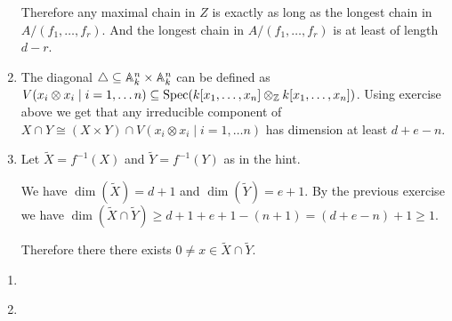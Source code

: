 \begin{exercise}{1}
\begin{enumerate}
{                Therefore any maximal chain in $Z$ is exactly as long as the
                longest chain in $A / (f_1, \dots, f_r)$. And the longest chain
                in $A / (f_1, \dots, f_r)$ is at least of length $d - r$.
            }
        \item{
                The diagonal $\triangle \subseteq \mathbb{A}^n_k \times \mathbb{A}^n_k$ can
                be defined as $V(x_i \otimes x_i \mid i = 1, \dots n) \subseteq
                \operatorname{Spec}(k[x_1, \dots, x_n] \otimes_{\mathbb{Z}} k[x_1, \dots, x_n])$.
                Using exercise above we get that any irreducible component of
                $X \cap Y \cong (X \times Y) \cap V(x_i \otimes x_i \mid i = 1,
                \dots n)$ has dimension at least $d + e - n$.
            }
        \item{
                Let $\tilde{X} = f^{-1}(X)$ and $\tilde{Y} = f^{-1}(Y)$ as in
                the hint.

                We have $\dim(\tilde{X}) = d + 1$ and $\dim(\tilde{Y}) = e + 1$.
                By the previous exercise we have $\dim(\tilde{X} \cap \tilde{Y})
                \geq d + 1 + e + 1 - (n + 1) = (d + e - n) + 1 \geq 1$.

                Therefore there there exists $0 \not= x \in \tilde{X} \cap
                \tilde{Y}$.
            }
    \end{enumerate}
\end{exercise}

\begin{exercise}{2}
    \begin{enumerate}
        \item{
            }
        \item{
            }
    \end{enumerate}
\end{exercise}


